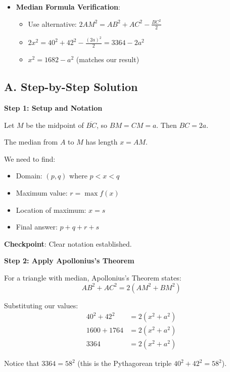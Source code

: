 \documentclass[12pt]{article}
\begin{document}
\begin{verificationbox}
\begin{itemize}[leftmargin=*]
    \item \textbf{Median Formula Verification}:
    \begin{itemize}
        \item Use alternative: $2AM^2 = AB^2 + AC^2 - \frac{BC^2}{2}$
        \item $2x^2 = 40^2 + 42^2 - \frac{(2a)^2}{2} = 3364 - 2a^2$
        \item $x^2 = 1682 - a^2$ \checkmark (matches our result)
    \end{itemize}
\end{itemize}
\end{verificationbox}

\begin{solutionbox}
\subsection*{A. Step-by-Step Solution}

\textbf{Step 1: Setup and Notation}

Let $M$ be the midpoint of $\overline{BC}$, so $BM = CM = a$. Then $BC = 2a$.

The median from $A$ to $M$ has length $x = AM$.

We need to find:
\begin{itemize}
    \item Domain: $(p, q)$ where $p < x < q$
    \item Maximum value: $r = \max f(x)$
    \item Location of maximum: $x = s$
    \item Final answer: $p + q + r + s$
\end{itemize}

\textbf{Checkpoint}: Clear notation established.

\vspace{0.3cm}

\textbf{Step 2: Apply Apollonius's Theorem}

For a triangle with median, Apollonius's Theorem states:
$$AB^2 + AC^2 = 2(AM^2 + BM^2)$$

Substituting our values:
\begin{align*}
    40^2 + 42^2 &= 2(x^2 + a^2) \\
    1600 + 1764 &= 2(x^2 + a^2) \\
    3364 &= 2(x^2 + a^2)
\end{align*}

Notice that $3364 = 58^2$ (this is the Pythagorean triple $40^2 + 42^2 = 58^2$).


\end{solutionbox}
\end{document}
